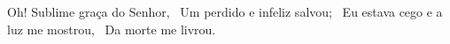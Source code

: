 Oh! Sublime graça do Senhor, 
Um perdido e infeliz salvou; 
Eu estava cego e a luz me mostrou, 
Da morte me livrou. 
